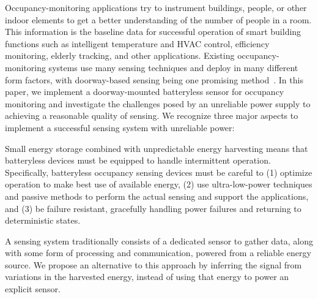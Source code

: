 Occupancy-monitoring applications try to instrument buildings, people, or other indoor elements to get a better understanding of the number of people in a room.
This information is the baseline data for successful operation of smart building functions such as intelligent temperature and HVAC control, efficiency monitoring, elderly tracking, and other applications.
Existing occupancy-monitoring systems use many sensing techniques and deploy in many different form factors, with doorway-based sensing being one promising method~\cite{hnat2012doorjamb, sonicdoor-buildsys2017}.
In this paper, we implement a doorway-mounted batteryless sensor for occupancy monitoring and investigate the challenges posed by an unreliable power supply to achieving a reasonable quality of sensing.
We recognize three major aspects to implement a successful sensing system with unreliable power:

Small energy storage combined with unpredictable energy harvesting means that batteryless devices must be equipped to handle intermittent operation.
Specifically, batteryless occupancy sensing devices must be careful to (1) optimize operation to make best use of available energy, (2) use ultra-low-power techniques and passive methods to perform the actual sensing and support the applications, and (3) be failure resistant, gracefully handling power failures and returning to deterministic states.

A sensing system traditionally consists of a dedicated sensor to gather data, along with some form of processing and communication, powered from a reliable energy source.
We propose an alternative to this approach by inferring the signal from variations in the harvested energy, instead of using that energy to power an explicit sensor.  

